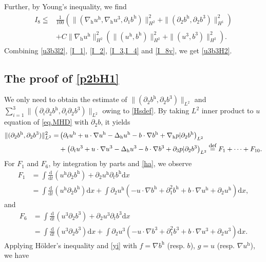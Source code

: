 \documentclass[11pt]{amsart}
\theoremstyle{definition}
\newcommand{\h}{\mathrm{h}}
\def\eqdefa{\buildrel\hbox{\footnotesize def}\over =}
\newcommand{\nablah}{\nabla_{\mathrm{h}}}
\numberwithin{equation}{section}
\begin{document}
Further, by Young's inequality, we find
\begin{align}\label{I_8v}
	I_8	\leqq& \frac{1}{100}\left( \|(\nablah u^\h,\nablah u^3,\partial_1b^\h)\|_{H^2}^2+\|(\partial_2b^\h,\partial_2b^3)\|_{H^1}^2\right)\nonumber\\
	&+C\|\nablah u^\h\|_{H^{2}}^2\left(\|(u^\h,b^\h)\|_{H^2}^2+\|(u^3,b^3)\|_{H^2}^2\right).
\end{align}
Combining \eqref{u3b3l2}, \eqref{I_1}, \eqref{I_2}, \eqref{I_3,I_4} and \eqref{I_8v}, we get \eqref{u3b3H2}.

\subsection{The proof of \eqref{p2bH1}}
We only need to obtain the estimate of $\|(\partial_2b^\h,\partial_2 b^3)\|_{L^2}$ and $\sum_{i=1}^3\|(\partial_i\partial_2b^\h,\partial_i\partial_2 b^3)\|_{L^2}$ owing to \eqref{Hsdef}. By taking $L^2$ inner product to $u$ equation of \eqref{eq.MHD} with $\partial_2b$, it yields
\begin{align}\label{p2b_enl2}
	\|(\partial_2b^\h,\partial_2 b^3)\|_{L^2}^2	=&\left(\partial_t u^\h+ u\cdot\nabla u^\h -\Delta_{\h}u^\h- b\cdot\nabla b^\h+\nablah p|\partial_2 b^\h\right)_{L^2}\nonumber\\
	&+\left(\partial_t u^3+ u\cdot\nabla u^3 -\Delta_{\h}u^3- b\cdot\nabla b^3+\partial_3 p|\partial_2 b^3\right)_{L^2} \eqdefa F_1+\cdots+F_{10}.
\end{align}
For $F_1$ and $F_6$, by integration by parts and \eqref{ha}, we observe
\begin{align}\label{f1deco}
	F_1 &=\int \frac{\mathrm{d}}{\mathrm{d} t}\left(u^\h\partial_2 b^\h\right)+\partial_2u^\h\partial_t b^\h \mathrm{d} x\nonumber\\&
	=\int \frac{\mathrm{d}}{\mathrm{d} t}\left(u^\h\partial_2 b^\h\right)\mathrm{d} x+\int\partial_2 u^\h\left(-u\cdot\nabla b^\h +\partial_1^2 b^\h+b\cdot\nabla u^\h +\partial_2 u^\h\right)\mathrm{d} x,
\end{align}
and
\begin{align*}
	F_6 &=\int \frac{\mathrm{d}}{\mathrm{d} t}\left(u^3\partial_2 b^3\right)+\partial_2u^3\partial_t b^3 \mathrm{d} x\\&
	=\int \frac{\mathrm{d}}{\mathrm{d} t}\left(u^3\partial_2 b^3\right)\mathrm{d} x+\int\partial_2 u^3\left(-u\cdot\nabla b^3 +\partial_1^2 b^3+b\cdot\nabla u^3 +\partial_2 u^3\right)\mathrm{d} x.
\end{align*}
Applying H\"older's inequality and \eqref{yi} with $f=\nabla b^\h$ (resp. $b$), $g=u$ (resp. $\nabla u^\h$), we have
\end{document}

